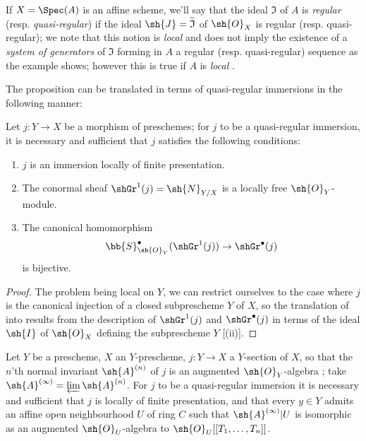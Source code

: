 \begin{env}[16.9.7]
\label{IV.16.9.7}
If $X = \Spec(A)$ is an affine scheme, we'll say that the ideal $\mathfrak{I}$ of $A$ is \emph{regular} (resp. \emph{quasi-regular}) if the ideal $\sh{J} = \widetilde{\mathfrak{I}}$ of $\sh{O}_X$ is regular (resp. quasi-regular);
we note that this notion is \emph{local} and does not imply the existence of a \emph{system of generators} of $\mathfrak{I}$ forming in $A$ a regular (resp. quasi-regular) sequence as the example  shows;
however this is true if $A$ is \emph{local} .

The proposition  can be translated in terms of quasi-regular immersions in the following manner:
\end{env}

\begin{proposition}[16.9.8]
\label{IV.16.9.8}
Let $j:Y \to X$ be a morphism of preschemes;
for $j$ to be a quasi-regular immersion, it is necessary and sufficient that $j$ satisfies the following conditions:
\begin{enumerate}
  \item[(i)] $j$ is an immersion locally of finite presentation.
  \item[(ii)] The conormal sheaf $\shGr^1(j) = \sh{N}_{Y/X}$  is a locally free $\sh{O}_Y$-module.
  \item[(iii)] The canonical homomorphism
  \[
    \bb{S}_{\sh{O}_Y}^\bullet(\shGr^1(j)) \to \shGr^\bullet(j)
  \]
   is bijective.
\end{enumerate}
\end{proposition}

\begin{proof}
The problem being local on $Y$, we can restrict ourselves to the case where $j$ is the canonical injection of a closed subprescheme $Y$ of $X$, so the translation of  into  results from the description of $\shGr^1(j)$ and $\shGr^\bullet(j)$ in terms of the ideal $\sh{I}$ of $\sh{O}_X$ defining the subprescheme $Y$ [(ii)].
\end{proof}

\begin{corollary}[16.9.9]
\label{IV.16.9.9}
Let $Y$ be a prescheme, $X$ an $Y$-prescheme, $j:Y \to X$ a $Y$-section of $X$, so that the $n$'th normal invariant $\sh{A}^{(n)}$ of $j$  is an augmented $\sh{O}_Y$-algebra ;
take $\sh{A}^{(\infty)} = \varprojlim \sh{A}^{(n)}$.
For $j$ to be a quasi-regular immersion it is necessary and sufficient that $j$ is locally of finite presentation, and that every $y \in Y$ admits an affine open neighbourhood $U$ of ring $C$ such that $\sh{A}^{(\infty)}|U$ is isomorphic as an augmented $\sh{O}_U$-algebra to $\sh{O}_U[[T_1, \dots, T_n]]$.
\end{corollary}

